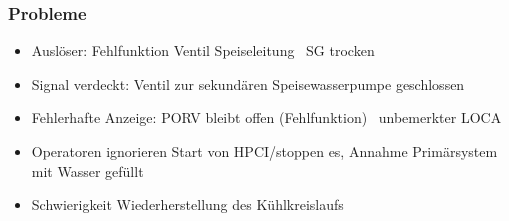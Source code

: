 \documentclass[12pt]{article}
\begin{document}
\subsubsection{Probleme}
\begin{itemize}[noitemsep]
	\item Auslöser: Fehlfunktion Ventil Speiseleitung \textrightarrow\ SG trocken
	\item Signal verdeckt: Ventil zur sekundären Speisewasserpumpe geschlossen
	\item Fehlerhafte Anzeige: PORV bleibt offen (Fehlfunktion) \textrightarrow\ unbemerkter LOCA
	\item Operatoren ignorieren Start von HPCI/stoppen es, Annahme Primärsystem mit Wasser gefüllt
	\item Schwierigkeit Wiederherstellung des Kühlkreislaufs
\end{itemize}
\end{document}
